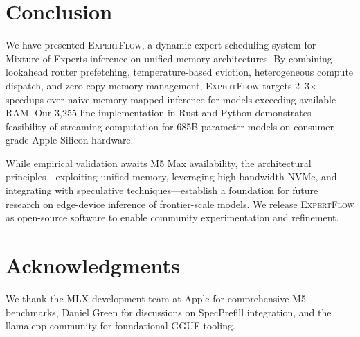 \documentclass[11pt]{article}
\begin{document}
\section{Conclusion}

We have presented \textsc{ExpertFlow}, a dynamic expert scheduling system for Mixture-of-Experts inference on unified memory architectures. By combining lookahead router prefetching, temperature-based eviction, heterogeneous compute dispatch, and zero-copy memory management, \textsc{ExpertFlow} targets 2--3$\times$ speedups over naive memory-mapped inference for models exceeding available RAM. Our 3,255-line implementation in Rust and Python demonstrates feasibility of streaming computation for 685B-parameter models on consumer-grade Apple Silicon hardware.

While empirical validation awaits M5 Max availability, the architectural principles—exploiting unified memory, leveraging high-bandwidth NVMe, and integrating with speculative techniques—establish a foundation for future research on edge-device inference of frontier-scale models. We release \textsc{ExpertFlow} as open-source software to enable community experimentation and refinement.

\section*{Acknowledgments}

We thank the MLX development team at Apple for comprehensive M5 benchmarks, Daniel Green for discussions on SpecPrefill integration, and the llama.cpp community for foundational GGUF tooling.
\end{document}
